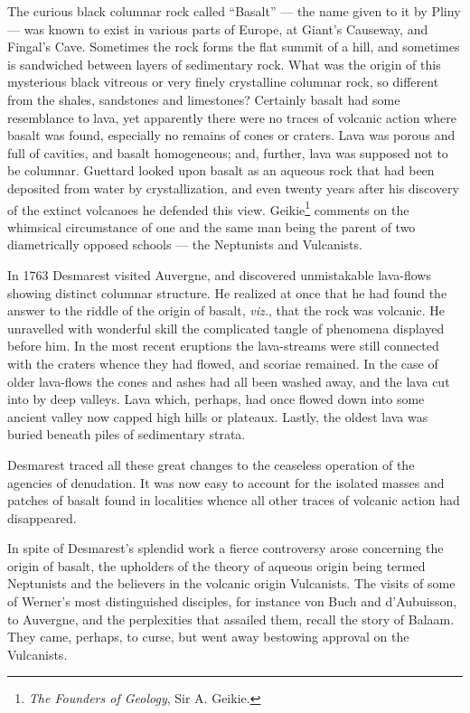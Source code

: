 \documentclass[a4paper, 12pt, oneside, landscape]{article}
\begin{document}
The curious black columnar rock called ``Basalt'' --- the name given to it by Pliny --- was known to exist in various parts of Europe, at Giant's Causeway, and Fingal's Cave. Sometimes the rock forms the flat summit of a hill, and sometimes is sandwiched between layers of sedimentary rock. What was the origin of this mysterious black vitreous or very finely crystalline columnar rock, so different from the shales, sandstones and limestones? Certainly basalt had some resemblance to lava, yet apparently there were no traces of volcanic action where basalt was found, especially no remains of cones or craters. Lava was porous and full of cavities, and basalt homogeneous; and, further, lava was supposed not to be columnar. Guettard looked upon basalt as an aqueous rock that had been deposited from water by crystallization, and even twenty years after his discovery of the extinct volcanoes he defended this view. Geikie\footnote{\emph{The Founders of Geology}, Sir A. Geikie.} comments on the whimsical circumstance of one and the same man being the parent of two diametrically opposed schools --- the Neptunists and Vulcanists.

In 1763 Desmarest visited Auvergne, and discovered unmistakable lava-flows showing distinct columnar structure. He realized at once that he had found the answer to the riddle of the origin of basalt, \emph{viz.}, that the rock was volcanic. He unravelled with wonderful skill the complicated tangle of phenomena displayed before him. In the most recent eruptions the lava-streams were still connected with the craters whence they had flowed, and scoriae remained. In the case of older lava-flows the cones and ashes had all been washed away, and the lava cut into by deep valleys. Lava which, perhaps, had once flowed down into some ancient valley now capped high hills or plateaux. Lastly, the oldest lava was buried beneath piles of sedimentary strata.

Desmarest traced all these great changes to the ceaseless operation of the agencies of denudation. It was now easy to account for the isolated masses and patches of basalt found in localities whence all other traces of volcanic action had disappeared.

In spite of Desmarest's splendid work a fierce controversy arose concerning the origin of basalt, the upholders of the theory of aqueous origin being termed Neptunists and the believers in the volcanic origin Vulcanists. The visits of some of Werner's most distinguished disciples, for instance von Buch and d'Aubuisson, to Auvergne, and the perplexities that assailed them, recall the story of Balaam. They came, perhaps, to curse, but went away bestowing approval on the Vulcanists.
\end{document}
